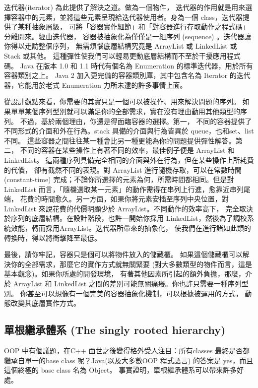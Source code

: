 迭代器(iterator) 為此提供了解決之道。做為一個物件，
迭代器的作用就是用來選擇容器中的元素，並將這些元素呈現給迭代器使用者。身為一個
class，迭代器提供了某種抽象層級，
可將「容器實作細節」和「對容器進行存取動作之程式碼」分離開來。經由迭代器，
容器被抽象化為僅僅是一組序列 (sequence) 。迭代器讓你得以走訪整個序列，
無需煩惱底層結構究竟是 ArrayList 或 LinkedList 或 Stack 或其他。
這種彈性使我們可以輕易更動底層結構而不至於干擾應用程式碼。 Java 在版本 1.0 和
1.1 時代有個名為 Enumeration 的標準迭代器，用於所有容器類別之上。 Java 2
加入更完備的容器類別庫，其中包含名為 Iterator 的迭代器，它能用於老式
Enumeration 力所未逮的許多事情上面。

從設計觀點來看，你需要的其實只是一個可以被操作、用來解決問題的序列。
如果單單某個序列型別就可以滿足你的全部需求，實在沒有理由動用其他類型的序列。
不過，基於兩個理由，你還是得面臨容器的選擇。第一，
不同的容器提供了不同形式的介面和外在行為。stack 具備的介面與行為皆異於
queue，也和set、list 不同。
這些容器之間往往某一種會比另一種更能為你的問題提供彈性解答。第二，
不同的容器在某些操作上有著不同的效率，最佳例子便是 ArrayList 和 LinkedList。
這兩種序列具備完全相同的介面與外在行為，但在某些操作上所耗費的代價，
卻有截然不同的表現。對 ArrayList 進行隨機存取，可以在常數時間 (constant-time)
完成；不論你所選擇的元素為何，所需時間都相同。但是對 LinkedList
而言，「隨機選取某一元素」的動作需得在串列上行進，愈靠近串列尾端，
花費的時間愈久。另一方面，如果你將元素安插至序列中央位置，對 LinkedList
來說花費的代價明顯少於 ArrayList。不同動作的效率高下，
完全取決於序列的底層結構。在設計階段，也許一開始你採用
LinkedList，然後為了調校系統效能，轉而採用ArrayList。迭代器所帶來的抽象化，
使我們在進行諸如此類的轉換時，得以將衝擊降至最低。

最後，請你牢記，容器只是個可以將物件放入的儲藏櫃。
如果這個儲藏櫃可以解決你的全部需求，那麼它的實作方式就無關緊要
(對大多數類型的物件而言，這是基本觀念)。如果你所處的開發環境，
有著其他因素所引起的額外負擔，那麼，介於 ArrayList 和 LinkedList
之間的差別可能無關痛癢。你也許只需要一種序列型別。
你甚至可以想像有一個完美的容器抽象化機制，可以根據被運用的方式，
動態改變其底層實作方式。
\subsection{單根繼承體系 (The singly rooted hierarchy)}
OOP 中有個議題，在C++ 面世之後變得格外受人注目：所有classes
最終是否都繼承自單一的base class 呢？Java(以及大多數OOP 程式語言)
的答案是 yes，而且這個終極的 base class 名為 Object。
事實證明，單根繼承體系可以帶來許多好處。

